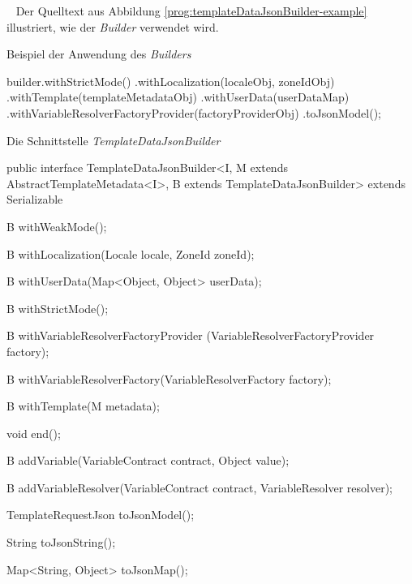 \ \newline 
Der Quelltext aus Abbildung \ref{prog:templateDataJsonBuilder-example} illustriert, wie der \emph{Builder} verwendet wird.

\begin{program}[h]
\caption{Beispiel der Anwendung des \emph{Builders}}
\label{prog:templateDataJsonBuilder-example}
\begin{JavaCode}
builder.withStrictMode() 
       .withLocalization(localeObj, zoneIdObj)
       .withTemplate(templateMetadataObj)
       .withUserData(userDataMap)
       .withVariableResolverFactoryProvider(factoryProviderObj)
       .toJsonModel();
\end{JavaCode}
\end{program}

\begin{program}[h]
\caption{Die Schnittstelle \emph{TemplateDataJsonBuilder}}
\label{prog:templateDataJsonBuilder}
\begin{JavaCode}
public interface TemplateDataJsonBuilder<I,
    M extends AbstractTemplateMetadata<I>,
    B extends TemplateDataJsonBuilder> extends Serializable {

    B withWeakMode();

    B withLocalization(Locale locale,
                       ZoneId zoneId);

    B withUserData(Map<Object, Object> userData);

    B withStrictMode();

    B withVariableResolverFactoryProvider
                         (VariableResolverFactoryProvider factory);

    B withVariableResolverFactory(VariableResolverFactory factory);

    B withTemplate(M metadata);

    void end();

    B addVariable(VariableContract contract,
                  Object value);

    B addVariableResolver(VariableContract contract,
                          VariableResolver resolver);

    TemplateRequestJson toJsonModel();

    String toJsonString();

    Map<String, Object> toJsonMap();
}
\end{JavaCode}
\end{program}
\ \newpage

